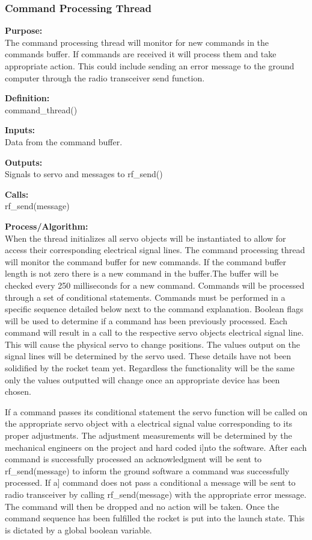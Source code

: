 \documentclass[10pt,draftclsnofoot,onecolumn,retainorgcmds]{IEEEtran}
\begin{document}
\subsubsection{Command Processing Thread}
{\bf Purpose:} \\
The command processing thread will monitor for new commands in the commands buffer. If commands are received it will process them and take appropriate action. This could include sending an error message to the ground computer through the radio transceiver send function. \par
{\bf Definition:} \\ 
command\_thread() \par
{\bf Inputs:} \\  Data from the command buffer. \par
{\bf Outputs:} \\ Signals to servo and messages to rf\_send() \par
{\bf Calls:} \\ 
rf\_send(message)  \par
{\bf Process/Algorithm:} \\
When the thread initializes all servo objects will be instantiated to allow for access their corresponding electrical signal lines. The command processing thread will monitor the command buffer for new commands. If the command buffer length is not zero there is a new command in the buffer.The buffer will be checked  every 250 milliseconds for a new command. Commands will be processed through a set of conditional statements. Commands must be performed in a specific sequence detailed below next to the command explanation. Boolean flags will be used to determine if a command has been previously processed.  Each command will result in a call to the respective servo objects electrical signal line. This will cause the physical servo to change positions. The values output on the signal lines will be determined by the servo used. These details have not been solidified by the rocket team yet. Regardless the functionality will be the same only the values outputted will change once an appropriate device has been chosen. \par
If a command passes its conditional statement the servo function will be called on the appropriate servo object with a electrical signal value corresponding to its proper adjustments. The adjustment measurements will be determined by the mechanical engineers on the project and hard coded i]nto the software. After each command is successfully processed an acknowledgment will be sent to rf\_send(message) to inform the ground software a command was successfully processed. If a] command does not pass a conditional a message will be sent to radio transceiver by calling rf\_send(message) with the appropriate error message. The command will then be dropped and no action will be taken. Once the command sequence has been fulfilled the rocket is put into the launch state. This is dictated by a global boolean variable.\par
\end{document}
